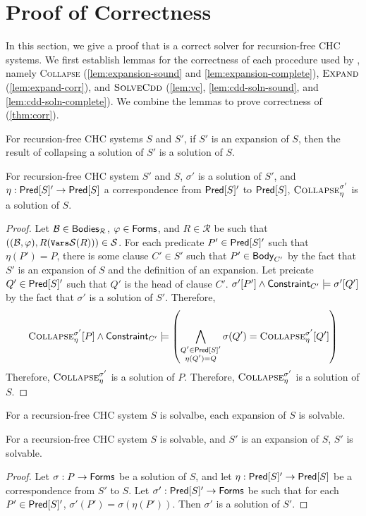 \section{Proof of Correctness}
\label{app:corr}
%
In this section, we give a proof that \sys is a correct solver for
recursion-free CHC systems.
%
We first establish lemmas for the correctness of each procedure used
by \sys, namely \textsc{Collapse} (\autoref{lem:expansion-sound} and
\autoref{lem:expansion-complete}), $\textsc{Expand}$
(\autoref{lem:expand-corr}), and $\textsc{SolveCdd}$
(\autoref{lem:vc}, \autoref{lem:cdd-soln-sound}, and
\autoref{lem:cdd-soln-complete}).
%
We combine the lemmas to prove correctness of \sys
(\autoref{thm:corr}).

For recursion-free CHC systems $S$ and $S'$, if $S'$ is
an expansion of $S$, then the result of collapsing a
solution of $S'$ is a solution of $S$.
%
\begin{lem}
  \label{lem:expansion-sound}
  For recursion-free CHC system $S'$ and $S$,
  $\sigma'$ is a solution of $S'$, and $\eta : \mathsf{Pred}[ S ]' \to
  \mathsf{Pred}[ S ]$ a correspondence from $\mathsf{Pred}[ S ]'$ to $\mathsf{Pred}[ S ]$,
  $\textsc{Collapse}_{\eta}^{\sigma'}$ is a solution of $S$.
\end{lem}
%
\begin{proof}
  Let $\mathcal{B} \in \mathsf{Bodies}_{\mathcal{R}}$, $\varphi \in \mathsf{Forms}$,
  and $R \in \mathcal{R}$ be such that $((\mathcal{B}, \varphi),
  R(\vars{ \mathcal{S} }(R))) \in \mathcal{S}$.
  For each predicate $P' \in \mathsf{Pred}[ S ]'$ such that $\eta(P') = P$, there is
  some clause $C' \in S'$ such that $P' \in \mathsf{Body}_{C'}$ by the fact that $S'$ is an expansion of
  $S$ and the definition of an expansion.
  Let preicate $Q' \in \mathsf{Pred}[ S ]'$ such that $Q'$ is the head of clause $C'$.
  $\sigma'[P'] \land \mathsf{Constraint}_{C'} \models \sigma'[Q']$ by
  the fact that $\sigma'$ is a solution of $S'$.
  Therefore,
  \[ \collapse{ \eta }{ \sigma' }[P] \land \consof{C'} \entails %
  \left( \bigland_{ \substack{Q' \in \predof{S}' \\ \eta(Q') = Q} }
  \sigma(Q') = %
  \collapse{\eta}{\sigma'}[Q'] \right)
  \]
  Therefore, $\textsc{Collapse}_{\eta}^{\sigma'}$ is a solution of $P$.
  Therefore, $\textsc{Collapse}_{\eta}^{\sigma'}$ is a solution of
  $S$.
\end{proof}

For a recursion-free CHC system $S$ is solvalbe, each expansion of $S$
is solvable.
\begin{lem}
  \label{lem:expansion-complete}
  For a recursion-free CHC system $S$ is solvable, and
  $S'$ is
  an expansion of $S$, $S'$ is solvable.
\end{lem}
%
\begin{proof}
  Let $\sigma : P \to \mathsf{Forms}$ be a solution of
  $S$, and let $\eta : \mathsf{Pred}[ S ]' \to \mathsf{Pred}[ S ]$ be a
  correspondence from $S'$ to $S$.
  Let $\sigma' : \mathsf{Pred}[ S ]' \to \mathsf{Forms}$ be such that for each $P'
  \in \mathsf{Pred}[ S ]'$, $\sigma'(P') = \sigma(\eta(P'))$.
  Then $\sigma'$ is a solution of $S'$.
\end{proof}

